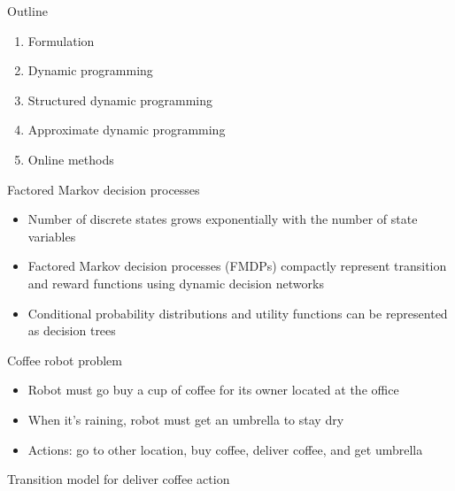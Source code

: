 \documentclass[handout]{dmu}
\begin{document}
\clearfoot
\begin{frame}{Outline}
\begin{enumerate}
\item Formulation
\item Dynamic programming
\item \alert{Structured dynamic programming}
\item Approximate dynamic programming
\item Online methods
\end{enumerate}
\end{frame}

\begin{frame}{Factored Markov decision processes}
\begin{itemize}
\item<1-> Number of discrete states grows exponentially with the number of state variables
\item <2-> \alert<2>{Factored Markov decision processes} (FMDPs) compactly represent transition and reward functions using dynamic decision networks
\item <3-> Conditional probability distributions and utility functions can be represented as decision trees
\end{itemize}
\end{frame}

\begin{frame}{Coffee robot problem}
\begin{itemize}
\item<1-> Robot must go buy a cup of coffee for its owner located at the office
\item <2-> When it's raining, robot must get an umbrella to stay dry
\item <3-> Actions: go to other location, buy coffee, deliver coffee, and get umbrella
\end{itemize}
\end{frame}

\begin{frame}{Transition model for deliver coffee action}
\end{frame}
\end{document}
